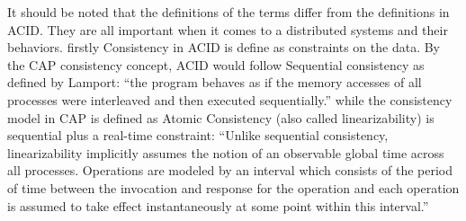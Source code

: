 \documentclass[a4paper,10pt,titlepage]{report}
\begin{document}
It should be noted that the definitions of the terms differ from the definitions in ACID. They are all important when it comes to a distributed systems and their behaviors. firstly Consistency in ACID is define as constraints on the data. By the CAP consistency concept, ACID would follow Sequential consistency as defined by Lamport\cite{lamport1993how}: “the program behaves as if the memory accesses of all processes were interleaved and then executed sequentially.” while the consistency model in CAP is defined as Atomic Consistency (also called linearizability) is sequential plus a real-time constraint: “Unlike sequential consistency, linearizability implicitly assumes the notion of an observable global time across all processes. Operations are modeled by an interval which consists of the period of time between the invocation and response for the operation and each operation is assumed to take effect instantaneously at some point within this interval.” \cite{CSL-TR-95-685}
\end{document}
